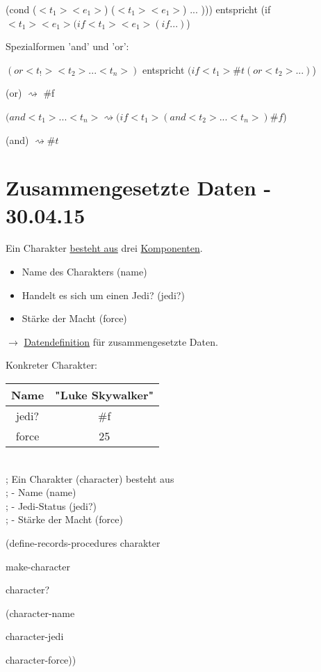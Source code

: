 \documentclass[a4paper, 20pt, openany]{book}
\begin{document}
(cond ($<t_1> <e_1>$) ($<t_1> <e_1>$) ... ))) entspricht (if $<t_1> <e_1> (if <t_1> <e_1> (if ...)$)

Spezialformen 'and' und 'or':
\begin{center}
$(or <t_!> <t_2> ... <t_n>)$ entspricht $(if <t_1> \#t (or <t_2> ...)$)

(or) $\rightsquigarrow$ \#f
\end{center}
\begin{center}
$(and <t_1>...<t_n> \rightsquigarrow (if <t_1> (and <t_2> ... <t_n>) \#f$)

(and) $\rightsquigarrow \# t$
\end{center}

\chapter{Zusammengesetzte Daten - 30.04.15}
Ein Charakter \underline{besteht aus} drei \underline{Komponenten}.
\begin{itemize}
  \item Name des Charakters (name)
  \item Handelt es sich um einen Jedi? (jedi?)
  \item Stärke der Macht (force)
\end{itemize}

$\rightarrow$ \underline{Datendefinition} für zusammengesetzte Daten.

Konkreter Charakter: \\

\begin{tabular}{c|c}
Name & "Luke Skywalker" \\ \hline
jedi? & \#f \\ \hline
force & 25 \\
\end{tabular}\\

; Ein Charakter (character) besteht aus \\
; - Name (name)\\
; - Jedi-Status (jedi?)\\
; - Stärke der Macht (force)\\

\begin{center}
(define-records-procedures charakter

make-character

character?

(character-name

character-jedi

character-force))
\end{center}
\end{document}
